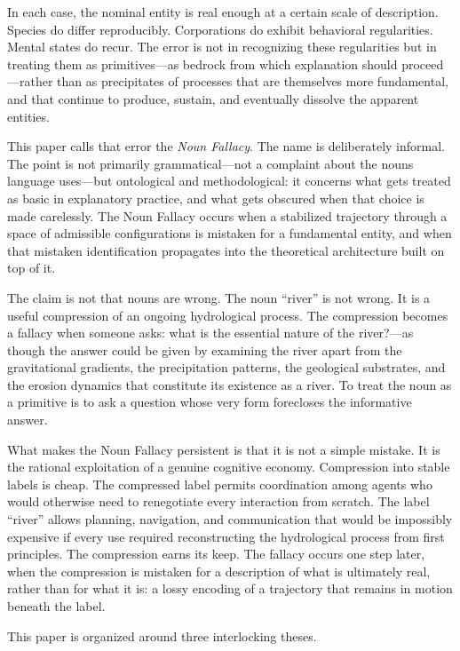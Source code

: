 \documentclass[12pt, a4paper]{article}
\theoremstyle{plain}
\theoremstyle{definition}
\theoremstyle{remark}
\begin{document}
In each case, the nominal entity is real enough at a certain scale of
description. Species do differ reproducibly. Corporations do exhibit
behavioral regularities. Mental states do recur. The error is not in
recognizing these regularities but in treating them as primitives---as
bedrock from which explanation should proceed---rather than as precipitates
of processes that are themselves more fundamental, and that continue to
produce, sustain, and eventually dissolve the apparent entities.

This paper calls that error the \emph{Noun Fallacy}. The name is deliberately
informal. The point is not primarily grammatical---not a complaint about the
nouns language uses---but ontological and methodological: it concerns what
gets treated as basic in explanatory practice, and what gets obscured when
that choice is made carelessly. The Noun Fallacy occurs when a stabilized
trajectory through a space of admissible configurations is mistaken for a
fundamental entity, and when that mistaken identification propagates into the
theoretical architecture built on top of it.

The claim is not that nouns are wrong. The noun ``river'' is not wrong.
It is a useful compression of an ongoing hydrological process. The compression
becomes a fallacy when someone asks: what is the essential nature of the
river?---as though the answer could be given by examining the river apart
from the gravitational gradients, the precipitation patterns, the geological
substrates, and the erosion dynamics that constitute its existence as a river.
To treat the noun as a primitive is to ask a question whose very form
forecloses the informative answer.

What makes the Noun Fallacy persistent is that it is not a simple mistake.
It is the rational exploitation of a genuine cognitive economy. Compression
into stable labels is cheap. The compressed label permits coordination among
agents who would otherwise need to renegotiate every interaction from scratch.
The label ``river'' allows planning, navigation, and communication that would
be impossibly expensive if every use required reconstructing the hydrological
process from first principles. The compression earns its keep. The fallacy
occurs one step later, when the compression is mistaken for a description of
what is ultimately real, rather than for what it is: a lossy encoding of a
trajectory that remains in motion beneath the label.

This paper is organized around three interlocking theses.
\end{document}
